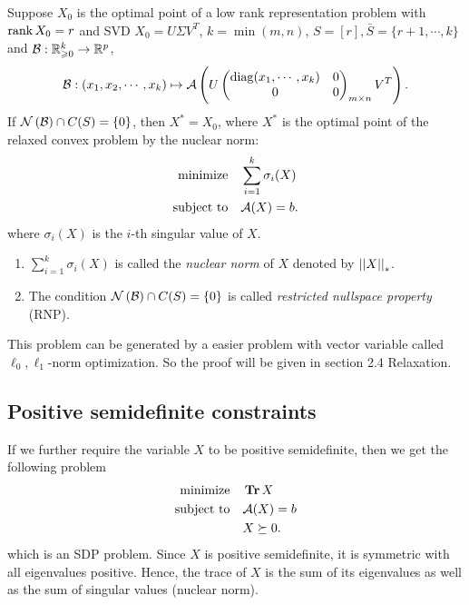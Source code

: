\documentclass[11pt]{article}
\begin{document}
\begin{theorem}
    Suppose \(X_0\) is the optimal point of a low rank representation problem with \(\operatorname{rank} X_0=r\) and SVD \(X_0 = U\Sigma V^T\), \(k=\min(m,n)\), \(S=[r],\bar{S}=\{r+1,\cdots ,k\}\) and \(\mathcal{B}:\mathbb R^k_{\geqslant 0} \to \mathbb R^p\),
    \[\mathcal{B}:(x_1,x_2,\cdots,x_k) \mapsto \mathcal{A}\left( U \begin{pmatrix}
        \operatorname{diag}(x_1,\cdots,x_k) & 0 \\
        0 & 0
    \end{pmatrix}_{m\times n} V^T\right).\]
    If \(\mathcal N\left(\mathcal{B}\right)\cap C(S) = \{0\}\), then \(X^\ast=X_0\), where \(X^\ast\) is the optimal point of the relaxed convex problem by the nuclear norm: 
    \[\begin{aligned}
        \textnormal{minimize}\quad & \sum_{i=1}^k\sigma_i(X)\\
        \textnormal{subject to}\quad & \mathcal A(X)=b.
    \end{aligned}\]
    where \(\sigma_i(X)\) is the \(i\)-th singular value of \(X\).
\end{theorem}

\begin{remark}
    \begin{enumerate}[(1)]
        \item \(\sum_{i=1}^{k} \sigma_i(X)\) is called the \emph{nuclear norm} of \(X\) denoted by \(\left|\left|X\right|\right|_\ast\).
        \item The condition \(\mathcal N\left(\mathcal{B}\right)\cap C(S) = \{0\}\) is called \emph{restricted nullspace property} (RNP).
    \end{enumerate}
\end{remark}

This problem can be generated by a easier problem with vector variable called \(\ell_0,\ell_1\)-norm optimization. So the proof will be given in section 2.4 Relaxation.

\subsection{Positive semidefinite constraints}

If we further require the variable \(X\) to be positive semidefinite, then we get the following problem 
\[\begin{aligned}
    \textnormal{minimize}\quad & \operatorname{\mathbf{Tr}} X\\
    \textnormal{subject to}\quad & \mathcal A(X)=b\\
    & X\succeq 0.
\end{aligned}\]
which is an SDP problem. Since \(X\) is positive semidefinite, it is symmetric with all eigenvalues positive. Hence, the trace of \(X\) is the sum of its eigenvalues as well as the sum of singular values (nuclear norm).
\end{document}
